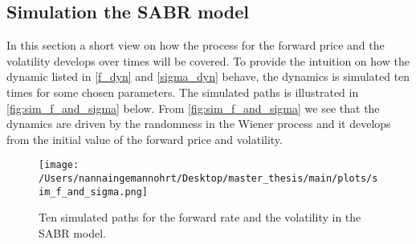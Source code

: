 \subsection{Simulation the SABR model}
In this section a short view on how the process for the forward price and the volatility develops over times will be covered. 
To provide the intuition on how the dynamic listed in \autoref{f_dyn} and \autoref{sigma_dyn} behave, the dynamics is simulated ten times
for some chosen parameters. The simulated paths is illustrated in \autoref{fig:sim_f_and_sigma} below. 
From \autoref{fig:sim_f_and_sigma} we see that the dynamics are driven by the randomness in the Wiener process and 
it develops from the initial value of the forward price and volatility.
\begin{figure}[H]
    \centering
    \texttt{[image: /Users/nannaingemannohrt/Desktop/master\_thesis/main/plots/sim\_f\_and\_sigma.png]}
    \caption{Ten simulated paths for the forward rate and the volatility in the SABR model.}
    \label{fig:sim_f_and_sigma}
\end{figure}
\noindent

